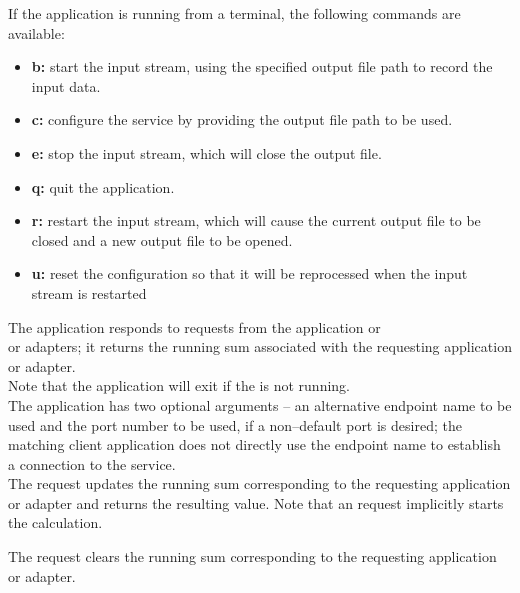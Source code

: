 If the application is running from a terminal, the following commands are available:
\begin{itemize}
\item \textbf{b:} start the input stream, using the specified output file path to record
the input data. 
\item \textbf{c:} configure the service by providing the output file path to be used. 
\item \textbf{e:} stop the input stream, which will close the output file. 
\item \textbf{q:} quit the application. 
\item \textbf{r:} restart the input stream, which will cause the current output file to be
closed and a new output file to be opened.
\item \textbf{u:} reset the configuration so that it will be reprocessed when the input
stream is restarted 
\end{itemize}
The  application responds to
requests from the  application or\\
 or
 adapters; it returns the running sum
associated with the requesting application or adapter.\\

Note that the application will exit if the
 is not running.\\

The application has two optional arguments -- an alternative endpoint name to be used and
the port number to be used, if a non--default port is desired; the matching client
application does not directly use the endpoint name to establish a connection to the
service.\\

The  request updates the running sum
corresponding to the requesting application or adapter and returns the resulting value.
Note that an  request implicitly starts the
calculation.\\
%

The  request clears the running sum
corresponding to the requesting application or adapter.\\
%


